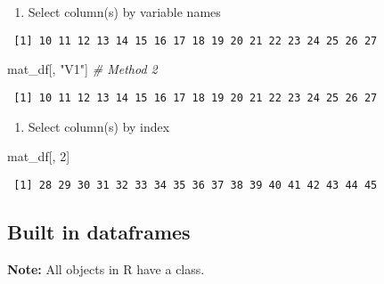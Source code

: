 \documentclass[
]{book}
\newenvironment{Shaded}{\begin{snugshade}}{\end{snugshade}}
\newcommand{\CommentTok}[1]{\textcolor[rgb]{0.56,0.35,0.01}{\textit{#1}}}
\newcommand{\DecValTok}[1]{\textcolor[rgb]{0.00,0.00,0.81}{#1}}
\newcommand{\NormalTok}[1]{#1}
\newcommand{\OperatorTok}[1]{\textcolor[rgb]{0.81,0.36,0.00}{\textbf{#1}}}
\newcommand{\StringTok}[1]{\textcolor[rgb]{0.31,0.60,0.02}{#1}}
\providecommand{\tightlist}{%
  \setlength{\itemsep}{0pt}\setlength{\parskip}{0pt}}
\begin{document}
\begin{enumerate}
\def\labelenumi{\arabic{enumi}.}
\tightlist
\item
  Select column(s) by variable names
\end{enumerate}

\begin{Shaded}
\end{Shaded}

\begin{verbatim}
 [1] 10 11 12 13 14 15 16 17 18 19 20 21 22 23 24 25 26 27
\end{verbatim}

\begin{Shaded}
\begin{Highlighting}[]
\NormalTok{mat_df[, }\StringTok{"V1"}\NormalTok{] }\CommentTok{# Method 2}
\end{Highlighting}
\end{Shaded}

\begin{verbatim}
 [1] 10 11 12 13 14 15 16 17 18 19 20 21 22 23 24 25 26 27
\end{verbatim}

\begin{enumerate}
\def\labelenumi{\arabic{enumi}.}
\setcounter{enumi}{1}
\tightlist
\item
  Select column(s) by index
\end{enumerate}

\begin{Shaded}
\begin{Highlighting}[]
\NormalTok{mat_df[, }\DecValTok{2}\NormalTok{]}
\end{Highlighting}
\end{Shaded}

\begin{verbatim}
 [1] 28 29 30 31 32 33 34 35 36 37 38 39 40 41 42 43 44 45
\end{verbatim}

\hypertarget{built-in-dataframes}{%
\subsection{Built in dataframes}\label{built-in-dataframes}}

\textbf{Note:} All objects in R have a class.
\end{document}
